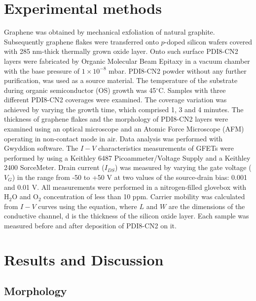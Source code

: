 \documentclass[preprint,aip,jap]{revtex4-2}
\begin{document}
\section{\label{sec:exper}Experimental methods}


Graphene was obtained by mechanical exfoliation of natural graphite.
 Subsequently graphene flakes were transferred onto $p$-doped silicon wafers covered with 285 nm-thick thermally grown oxide layer.
 Onto such surface PDI8-CN2 layers were fabricated by Organic Molecular Beam Epitaxy in a vacuum chamber with the base pressure of $1\times10^{-8}$ mbar.
 PDI8-CN2 powder without any further purification, was used as a source material.
 The temperature of the substrate during organic semiconductor (OS) growth was 45$^\circ$C.
 Samples with three different PDI8-CN2 coverages were examined.
 The coverage variation was achieved by varying the growth time, which comprised 1, 3 and 4 minutes.
 The thickness of graphene flakes and the morphology of PDI8-CN2 layers were examined using an optical microscope and an Atomic Force Microscope (AFM) operating in non-contact mode in air.
 Data analysis was performed with Gwyddion software\cite{necas-2012}.
 The $I-V$ characteristics measurements of GFETs were performed by using a Keithley 6487 Picoammeter/Voltage Supply and a Keithley 2400 SorceMeter.
 Drain current ($I_{DS}$) was measured by varying the gate voltage ($V_G$) in the range from -50 to +50 V at two values of the source-drain bias: 0.001 and 0.01 V.
 All measurements were performed in a nitrogen-filled glovebox with H$_2$O and O$_2$ concentration of less than 10 ppm.
  Carrier mobility was calculated from $I-V$ curves using the equation, where $L$ and $W$ are the dimensions of the conductive channel, d is the thickness of the silicon oxide layer.
 Each sample was measured before and after deposition of PDI8-CN2 on it.


\section{\label{sec:res}Results and Discussion}

\subsection{\label{sec:morph}Morphology}
\end{document}

